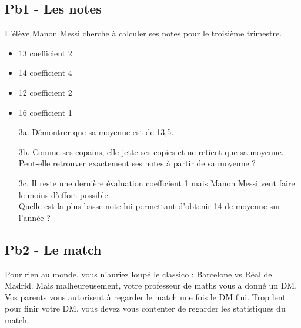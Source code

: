 \begin{multicols}{2}

\subsection*{Pb1 - Les notes}

L'élève Manon Messi cherche à calculer ses notes pour le troisième trimestre.

\begin{itemize}[label={$\bullet$}]
  \item 13 coefficient 2
  \item 14 coefficient 4
  \item 12 coefficient 2
  \item 16 coefficient 1
\end{itemize} 

\begin{enumerate}
  \item[3a.] Démontrer que sa moyenne est de 13,5.
  \item[3b.] Comme ses copains, elle jette ses copies et ne retient que sa moyenne. \\
  Peut-elle retrouver exactement ses notes à partir de sa moyenne ? 
  \item[3c.] Il reste une dernière évaluation coefficient 1 mais Manon Messi veut faire le moins d'effort possible. \\
  Quelle est la plus basse note lui permettant d'obtenir 14 de moyenne sur l'année ?
\end{enumerate} 

\columnbreak

\Pointilles[18]

\end{multicols}

\subsection*{Pb2 - Le match}

Pour rien au monde, vous n'auriez loupé le classico : Barcelone vs Réal de Madrid. Mais malheureusement, votre professeur de maths vous a donné un DM. Vos parents vous autorisent à regarder le match une fois le DM fini. Trop lent pour finir votre DM, vous devez vous contenter de regarder les statistiques du match. 

